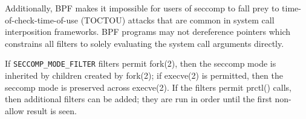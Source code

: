 Additionally, BPF makes it impossible for users of seccomp to fall prey
to time-of-check-time-of-use (TOCTOU) attacks that are common in system
call interposition frameworks.  BPF programs may not dereference
pointers which constrains all filters to solely evaluating the system
call arguments directly.

   If \lstinline$SECCOMP_MODE_FILTER$ filters permit fork(2), then the seccomp mode
              is inherited by children created by fork(2); if execve(2) is
              permitted, then the seccomp mode is preserved across execve(2).  If
              the filters permit prctl() calls, then additional filters can be
              added; they are run in order until the first non-allow result is
              seen.
           


             